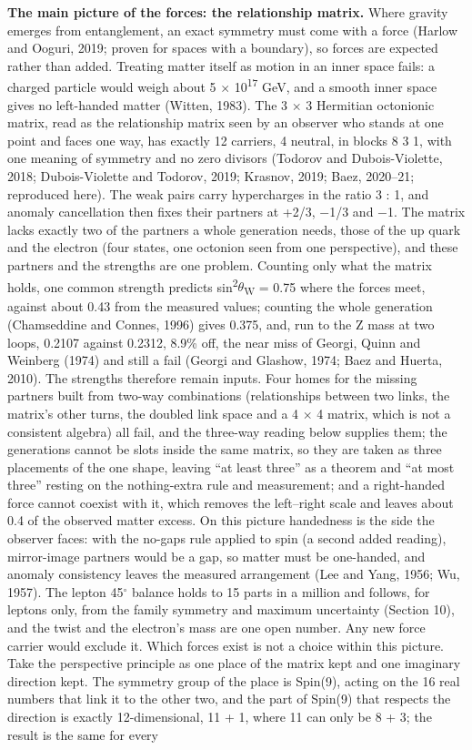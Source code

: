 \documentclass[
  11pt,
]{article}
\begin{document}
\textbf{The main picture of the forces: the relationship matrix.} Where gravity emerges from entanglement, an exact symmetry must come with a force (Harlow and Ooguri, 2019; proven for spaces with a boundary), so forces are expected rather than added. Treating matter itself as motion in an inner space fails: a charged particle would weigh about 5 \ensuremath{\times} 10\textsuperscript{17} GeV, and a smooth inner space gives no left-handed matter (Witten, 1983). The 3 \ensuremath{\times} 3 Hermitian octonionic matrix, read as the relationship matrix seen by an observer who stands at one point and faces one way, has exactly 12 carriers, 4 neutral, in blocks 8 \textbar{} 3 \textbar{} 1, with one meaning of symmetry and no zero divisors (Todorov and Dubois-Violette, 2018; Dubois-Violette and Todorov, 2019; Krasnov, 2019; Baez, 2020--21; reproduced here). The weak pairs carry hypercharges in the ratio 3 : 1, and anomaly cancellation then fixes their partners at +2/3, \ensuremath{-}1/3 and \ensuremath{-}1. The matrix lacks exactly two of the partners a whole generation needs, those of the up quark and the electron (four states, one octonion seen from one perspective), and these partners and the strengths are one problem. Counting only what the matrix holds, one common strength predicts sin\textsuperscript{2}\ensuremath{\theta}\textsubscript{W} = 0.75 where the forces meet, against about 0.43 from the measured values; counting the whole generation (Chamseddine and Connes, 1996) gives 0.375, and, run to the Z mass at two loops, 0.2107 against 0.2312, 8.9\% off, the near miss of Georgi, Quinn and Weinberg (1974) and still a fail (Georgi and Glashow, 1974; Baez and Huerta, 2010). The strengths therefore remain inputs. Four homes for the missing partners built from two-way combinations (relationships between two links, the matrix's other turns, the doubled link space and a 4 \ensuremath{\times} 4 matrix, which is not a consistent algebra) all fail, and the three-way reading below supplies them; the generations cannot be slots inside the same matrix, so they are taken as three placements of the one shape, leaving ``at least three'' as a theorem and ``at most three'' resting on the nothing-extra rule and measurement; and a right-handed force cannot coexist with it, which removes the left--right scale and leaves about 0.4 of the observed matter excess. On this picture handedness is the side the observer faces: with the no-gaps rule applied to spin (a second added reading), mirror-image partners would be a gap, so matter must be one-handed, and anomaly consistency leaves the measured arrangement (Lee and Yang, 1956; Wu, 1957). The lepton 45\ensuremath{^\circ} balance holds to 15 parts in a million and follows, for leptons only, from the family symmetry and maximum uncertainty (Section 10), and the twist and the electron's mass are one open number. Any new force carrier would exclude it. Which forces exist is not a choice within this picture. Take the perspective principle as one place of the matrix kept and one imaginary direction kept. The symmetry group of the place is Spin(9), acting on the 16 real numbers that link it to the other two, and the part of Spin(9) that respects the direction is exactly 12-dimensional, 11 + 1, where 11 can only be 8 + 3; the result is the same for every 
\end{document}
